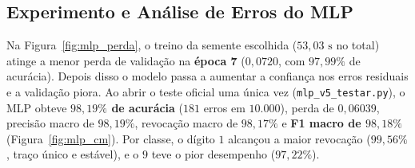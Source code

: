 \documentclass[
	12pt,
	a4paper,
	article,
	twocolumn
]{abntex2}
\begin{document}
\begin{table}[htbp]
\centering
\caption{Seleção do MLP na validação ($3$ sementes, $50$ épocas).}
\label{tab:mlp_val}
\end{table}

\subsection{Experimento e Análise de Erros do MLP}

Na Figura~\ref{fig:mlp_perda}, o treino da semente escolhida ($53{,}03\text{ s}$ no total) atinge a menor perda de validação na \textbf{época 7} ($0{,}0720$, com $97{,}99\%$ de acurácia). Depois disso o modelo passa a aumentar a confiança nos erros residuais e a validação piora. Ao abrir o teste oficial uma única vez (\texttt{mlp\_v5\_testar.py}), o MLP obteve \textbf{$98{,}19\%$ de acurácia} ($181$ erros em $10.000$), perda de $0{,}06039$, precisão macro de $98{,}19\%$, revocação macro de $98{,}17\%$ e \textbf{F1 macro de $98{,}18\%$} (Figura~\ref{fig:mlp_cm}). Por classe, o dígito $1$ alcançou a maior revocação ($99{,}56\%$, traço único e estável), e o $9$ teve o pior desempenho ($97{,}22\%$).
\end{document}
